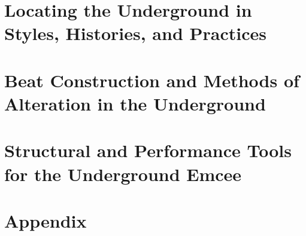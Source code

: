 \documentclass[12pt]{report}
\begin{document}
\chapter{Locating the Underground in Styles, Histories, and Practices}


\chapter{Beat Construction and Methods of Alteration in the Underground}


\chapter{Structural and Performance Tools for the Underground Emcee}



\singlespacing
\printbibliography
{}
\nocite{*}

\chapter*{Appendix}

\end{document}
